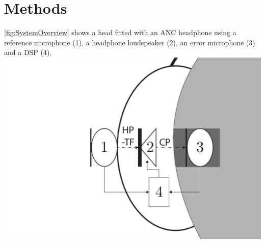 \section{Methods}
\autoref{fig:SystemOverview} shows a head fitted with an ANC headphone using a reference microphone (1), a headphone loudspeaker (2), an error microphone (3) and a DSP (4).
{
	\includegraphics[width=1\columnwidth]{figures/ArticleIllustrations/BasicOverviewZoomed}
	\label{fig:SystemOverview}
}




